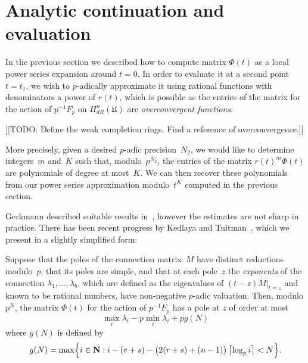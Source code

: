 \section{Analytic continuation and evaluation}

In the previous section we described how to compute matrix $\Phi(t)$ as 
a local power series expansion around $t = 0$.  In order to evaluate it 
at a second point $t = t_1$, we wish to $p$-adically approximate it 
using rational functions with denominators a power of $r(t)$, which 
is possible as the entries of the matrix for the action of $p^{-1} F_p$ 
on $H_{dR}^{n}(\mathfrak{U})$ are \emph{overconvergent functions}.

[[TODO:  Define the weak completion rings.  Find a reference of 
overconvergence.]]

More precisely, given a desired $p$-adic precision~$N_2$, we would 
like to determine integers~$m$ and~$K$ such that, modulo~$p^{N_2}$, 
the entries of the matrix $r(t)^m \Phi(t)$ are polynomials of degree 
at most~$K$.  We can then recover these polynomials from our power 
series approximation modulo~$t^K$ computed in the previous section.

Gerkmann described suitable results in~\citep[\S 6]{Gerkmann2007}, 
however the estimates are not sharp in practice.  There has been recent 
progress by Kedlaya and Tuitman~\citep[Theorem~2.1]{KedlayaTuitman2012}, 
which we present in a slightly simplified form:

\begin{thm} \label{thm:KedlayaTuitman}
Suppose that the poles of the connection matrix~$M$ have distinct 
reductions modulo~$p$, that its poles are simple, and that at each 
pole~$z$ the \emph{exponents} of the connection $\lambda_1, \dotsc, \lambda_b$,
which are defined as the eigenvalues of $(t-z) M \vert_{t=z}$ and known to be 
rational numbers, have non-negative $p$-adic valuation.  Then, modulo $p^N$, 
the matrix $\Phi(t)$ for the action of $p^{-1} F_p$ has a pole at $z$ of order 
at most 
\begin{equation} \label{eq:KedlayaTuitman}
\max_{i} \lambda_i - p \min_{i} \lambda_i + p g(N)
\end{equation}
where $g(N)$ is defined by 
\begin{equation}
g(N) = \max\Bigl\{ i \in \mathbf{N} : i - (r+s) - \bigl(2(r+s) + (n-1)\bigr) \left\lceil\log_p i\right\rceil < N \Bigr\}.
\end{equation}
\end{thm}

